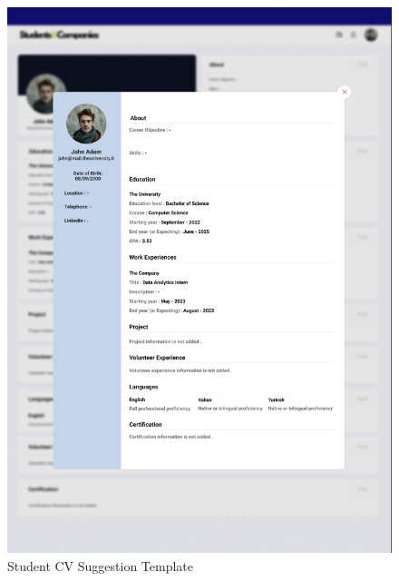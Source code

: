 \documentclass[a4paper,12pt]{article}
\begin{document}
\begin{figure}[H]
    \centering
    \includegraphics[scale = 0.65]{figures/UserInterfaces/Student/CVSuggestion.png}
    \caption{Student CV Suggestion Template}
     \centering
\end{figure}
\newpage
\end{document}
